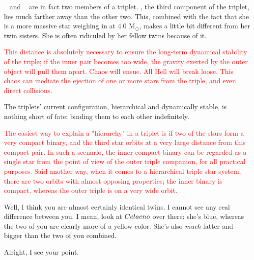 \documentclass[main.tex]{subfiles}
\begin{document}
\par \nar \rmtaygete~ and \rmalcyone~ are in fact two members of a triplet.  \rmcelaeno, the third component of the triplet, lies much farther away than the other two.  This, combined with the fact that she is a more massive star weighing in at 4.0 M$_{\odot}$, makes \rmcelaeno a little bit different from her twin sisters.  She is often ridiculed by her fellow twins because of it.

\begin{tcolorbox}[sharp corners, colback=red!30, colframe=red!80!blue, title=Dynamical Stability]
\par \textcolor{red} {This distance is absolutely necessary to ensure the long-term dynamical stability of the triple;  if the inner pair becomes too wide, the gravity exerted by the outer object will pull them apart.  Chaos will ensue.  All Hell will break loose.  This chaos can mediate the ejection of one or more stars from the triple, and even direct collisions.}  
\end{tcolorbox}

\par \nar The triplets' current configuration, hierarchical and dynamically stable, is nothing short of fate; binding them to each other indefinitely.

\begin{tcolorbox}[sharp corners, colback=red!30, colframe=red!80!blue, title=Orbital Hierarchies]
\par \textcolor{red} {The easiest way to explain a "hierarchy" in a triplet is if two of the stars form a very compact binary, and the third star orbits at a very large distance from this compact pair.  In such a scenario, the inner compact binary can be regarded as a single star from the point of view of the outer triple companion, for all practical purposes.  Said another way, when it comes to a hierarchical triple star system, there are two orbits with almost opposing properties; the inner binary is compact, whereas the outer triple is on a very wide orbit.}
\end{tcolorbox}

\par \Maia Well, I think you are almost certainly identical twins.  I cannot see any real difference between you.  I mean, look at $Celaeno$ over there; she's blue, whereas the two of you are clearly more of a yellow color.  She's also \textit{much} fatter and bigger than the two of you combined.  

\par \Celaeno Alright, I see your point.
\end{document}
